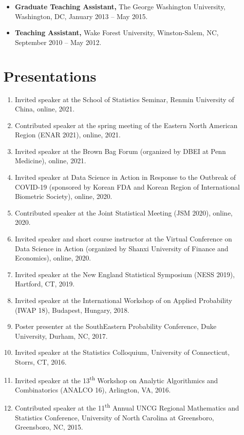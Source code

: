 \documentclass[margin]{res}
\begin{document}
\begin{resume}
\begin{itemize}
	\item{\bf Graduate Teaching Assistant,} The George Washington University, Washington, DC, January 2013 -- May 2015.
	
	\item{\bf Teaching Assistant,} Wake Forest University, Winston-Salem, NC, September 2010 -- May 2012.
\end{itemize}

\section{Presentations}
\begin{enumerate}
	\item Invited speaker at the School of Statistics Seminar, 
	Renmin University of China, online, 2021.
	\item Contributed speaker at the spring meeting of the Eastern 
	North American Region (ENAR 2021), online, 2021.
	\item Invited speaker at the Brown Bag Forum (organized by DBEI 
	at Penn Medicine), online, 2021.
	\item Invited speaker at Data Science in Action in Response to 
	the Outbreak of COVID-19 (sponsored by Korean FDA and Korean 
	Region of International Biometric Society), online, 2020.
	\item Contributed speaker at the Joint Statistical Meeting (JSM 
	2020), 
	online, 2020.
	\item Invited speaker and short course instructor at the Virtual 
	Conference on Data Science in Action (organized by Shanxi 
	University of Finance and Economics), online, 2020.
	\item Invited speaker at the New England Statistical Symposium (NESS 2019), Hartford, CT, 2019.
	\item Invited speaker at the International Workshop of on Applied Probability (IWAP 18), Budapest, Hungary, 2018.
	\item Poster presenter at the SouthEastern Probability Conference, Duke University, Durham, NC, 2017.
	\item Invited speaker at the Statistics Colloquium, University of Connecticut, Storrs, CT, 2016.
	\item Invited speaker at the 13\textsuperscript{th} Workshop on Analytic Algorithmics and Combinatorics (ANALCO 16), Arlington, VA, 2016.
	\item Contributed speaker at the 11\textsuperscript{th} Annual UNCG Regional Mathematics and Statistics Conference, University of North Carolina at Greensboro, Greensboro, NC, 2015.

\end{enumerate}
\end{resume}
\end{document}
